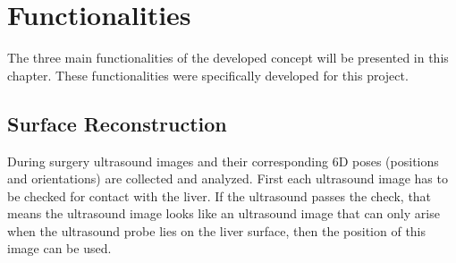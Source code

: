 \section{Functionalities}
The three main functionalities of the developed concept will be presented in
this chapter. These functionalities were specifically developed for this project.
\subsection{Surface Reconstruction}
During surgery ultrasound images and their corresponding 6D poses (positions and
orientations) are collected and analyzed. First each ultrasound image has to be
checked for contact with the liver. If the ultrasound passes the check, that
means the ultrasound image looks like an ultrasound image that can only arise
when the ultrasound probe lies on the liver surface, then the position of this
image can be used.

